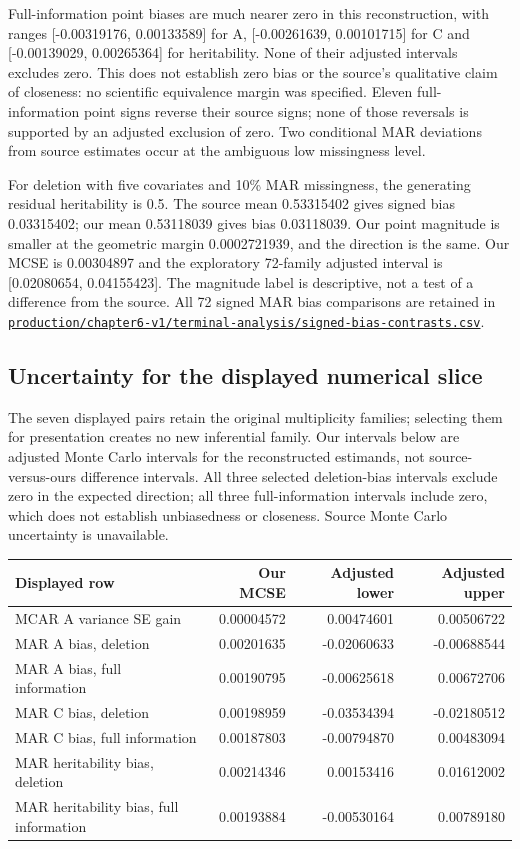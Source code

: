 \documentclass[11pt]{article}
\newcommand{\file}[1]{\href{https://github.com/alectionary/vibe-math/blob/master/formalization/schwabe-psychometric-genetics/#1}{\nolinkurl{#1}}}
\begin{document}
Full-information point biases are much nearer zero in this reconstruction, with ranges [-0.00319176, 0.00133589] for A, [-0.00261639, 0.00101715] for C and [-0.00139029, 0.00265364] for heritability. None of their adjusted intervals excludes zero. This does not establish zero bias or the source's qualitative claim of closeness: no scientific equivalence margin was specified. Eleven full-information point signs reverse their source signs; none of those reversals is supported by an adjusted exclusion of zero. Two conditional MAR deviations from source estimates occur at the ambiguous low missingness level.

For deletion with five covariates and 10\% MAR missingness, the generating residual heritability is 0.5. The source mean 0.53315402 gives signed bias 0.03315402; our mean 0.53118039 gives bias 0.03118039. Our point magnitude is smaller at the geometric margin 0.0002721939, and the direction is the same. Our MCSE is 0.00304897 and the exploratory 72-family adjusted interval is [0.02080654, 0.04155423]. The magnitude label is descriptive, not a test of a difference from the source. All 72 signed MAR bias comparisons are retained in \file{production/chapter6-v1/terminal-analysis/signed-bias-contrasts.csv}.

\subsection{Uncertainty for the displayed numerical slice}
The seven displayed pairs retain the original multiplicity families; selecting them for presentation creates no new inferential family. Our intervals below are adjusted Monte Carlo intervals for the reconstructed estimands, not source-versus-ours difference intervals. All three selected deletion-bias intervals exclude zero in the expected direction; all three full-information intervals include zero, which does not establish unbiasedness or closeness. Source Monte Carlo uncertainty is unavailable.
{\small\setlength{\tabcolsep}{6pt}\begin{tabular}{@{}lrrr@{}}\toprule
Displayed row & Our MCSE & Adjusted lower & Adjusted upper\\\midrule
MCAR A variance SE gain & 0.00004572 & 0.00474601 & 0.00506722\\
MAR A bias, deletion & 0.00201635 & -0.02060633 & -0.00688544\\
MAR A bias, full information & 0.00190795 & -0.00625618 & 0.00672706\\
MAR C bias, deletion & 0.00198959 & -0.03534394 & -0.02180512\\
MAR C bias, full information & 0.00187803 & -0.00794870 & 0.00483094\\
MAR heritability bias, deletion & 0.00214346 & 0.00153416 & 0.01612002\\
MAR heritability bias, full information & 0.00193884 & -0.00530164 & 0.00789180\\
\bottomrule\end{tabular}}\par
\end{document}
